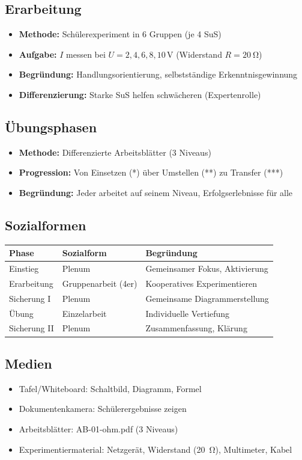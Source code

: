 \documentclass[11pt,a4paper]{article}
\begin{document}
\subsection{Erarbeitung}
\begin{itemize}
    \item \textbf{Methode:} Schülerexperiment in 6 Gruppen (je 4 SuS)
    \item \textbf{Aufgabe:} $I$ messen bei $U = 2, 4, 6, 8, 10\,\si{\volt}$ (Widerstand $R = \SI{20}{\ohm}$)
    \item \textbf{Begründung:} Handlungsorientierung, selbstständige Erkenntnisgewinnung
    \item \textbf{Differenzierung:} Starke SuS helfen schwächeren (Expertenrolle)
\end{itemize}

\subsection{Übungsphasen}
\begin{itemize}
    \item \textbf{Methode:} Differenzierte Arbeitsblätter (3 Niveaus)
    \item \textbf{Progression:} Von Einsetzen (*) über Umstellen (**) zu Transfer (***)
    \item \textbf{Begründung:} Jeder arbeitet auf seinem Niveau, Erfolgserlebnisse für alle
\end{itemize}

\subsection{Sozialformen}
\begin{tabular}{|l|l|l|}
\hline
\textbf{Phase} & \textbf{Sozialform} & \textbf{Begründung} \\
\hline
Einstieg & Plenum & Gemeinsamer Fokus, Aktivierung \\
\hline
Erarbeitung & Gruppenarbeit (4er) & Kooperatives Experimentieren \\
\hline
Sicherung I & Plenum & Gemeinsame Diagrammerstellung \\
\hline
Übung & Einzelarbeit & Individuelle Vertiefung \\
\hline
Sicherung II & Plenum & Zusammenfassung, Klärung \\
\hline
\end{tabular}

\subsection{Medien}
\begin{itemize}
    \item Tafel/Whiteboard: Schaltbild, Diagramm, Formel
    \item Dokumentenkamera: Schülerergebnisse zeigen
    \item Arbeitsblätter: AB-01-ohm.pdf (3 Niveaus)
    \item Experimentiermaterial: Netzgerät, Widerstand (\SI{20}{\ohm}), Multimeter, Kabel
\end{itemize}
\end{document}

